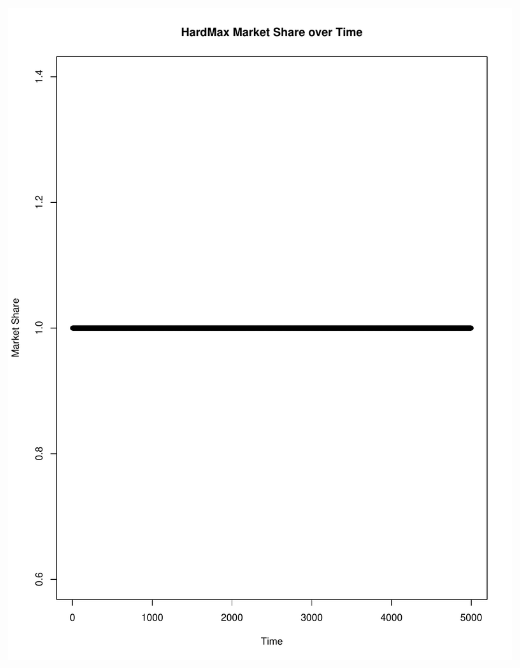 \documentclass[11pt,letterpaper]{article}
\begin{document}
\includegraphics[scale=0.30]{standard_ms_over_time} \\
\vspace{0.25cm}
\end{document}
